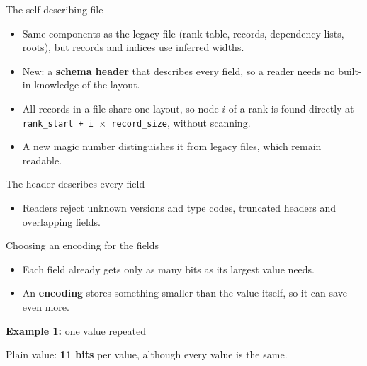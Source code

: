 \documentclass[aspectratio=169,11pt]{beamer}
\newcommand{\diagram}[1]{\resizebox{\linewidth}{!}{}}
\newcommand{\vals}[1]{\foreach \v [count=\k] in {#1} \node[draw=black!65,fill=blue!8,minimum height=6mm,minimum width=14mm,font=\small,inner sep=2pt] at (\k*1.5,0) {\v};}
\begin{document}
\begin{frame}{The self-describing file}
\diagram{file-sections}
\vspace{2mm}
\begin{itemize}
\item Same components as the legacy file (rank table, records, dependency lists, roots), but records and indices use inferred widths.
\item New: a \textbf{schema header} that describes every field, so a reader needs no built-in knowledge of the layout.
\item All records in a file share one layout, so node $i$ of a rank is found directly at \texttt{rank\_start + i $\times$ record\_size}, without scanning.
\item A new magic number distinguishes it from legacy files, which remain readable.
\end{itemize}
\end{frame}

\begin{frame}{The header describes every field}
\centering\vfill
\resizebox{\linewidth}{!}{}
\vfill
\par\raggedright
\small
\begin{itemize}
\item Readers reject unknown versions and type codes, truncated headers and overlapping fields.
\end{itemize}
\end{frame}

\begin{frame}{Choosing an encoding for the fields}
\begin{itemize}
\item Each field already gets only as many bits as its largest value needs.
\item An \textbf{encoding} stores something smaller than the value itself, so it can save even more.
\end{itemize}
\vspace{4mm}
\textbf{Example 1:} one value repeated
\vspace{2mm}

\vspace{3mm}

Plain value: \textbf{11 bits} per value, although every value is the same.
\end{frame}
\end{document}
